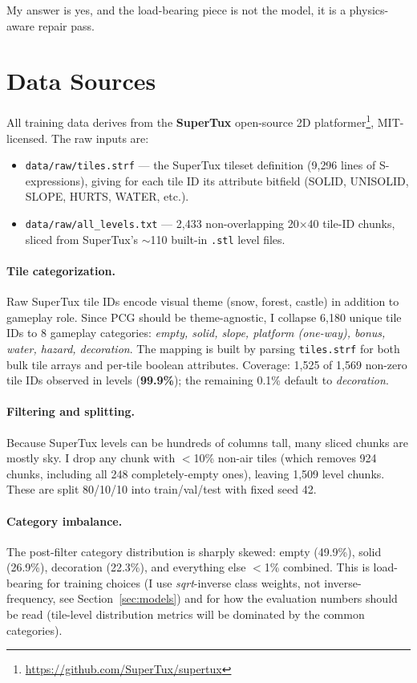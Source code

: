 \documentclass[11pt]{article}
\begin{document}
My answer is yes, and the load-bearing piece is not the model, it
is a physics-aware repair pass.

\section{Data Sources}

All training data derives from the \textbf{SuperTux} open-source 2D
platformer\footnote{\url{https://github.com/SuperTux/supertux}},
MIT-licensed. The raw inputs are:

\begin{itemize}
    \item \texttt{data/raw/tiles.strf} --- the SuperTux tileset
    definition (9{,}296 lines of S-expressions), giving for each tile
    ID its attribute bitfield (SOLID, UNISOLID, SLOPE, HURTS, WATER,
    etc.).
    \item \texttt{data/raw/all\_levels.txt} --- 2{,}433 non-overlapping
    20$\times$40 tile-ID chunks, sliced from SuperTux's $\sim$110
    built-in \texttt{.stl} level files.
\end{itemize}

\paragraph{Tile categorization.}
Raw SuperTux tile IDs encode visual theme (snow, forest, castle) in
addition to gameplay role. Since PCG should be theme-agnostic, I
collapse 6{,}180 unique tile IDs to 8 gameplay categories:
\emph{empty, solid, slope, platform (one-way), bonus, water, hazard,
decoration}. The mapping is built by parsing \texttt{tiles.strf} for
both bulk tile arrays and per-tile boolean attributes. Coverage:
1{,}525 of 1{,}569 non-zero tile IDs observed in levels (\textbf{99.9\%});
the remaining 0.1\% default to \emph{decoration}.

\paragraph{Filtering and splitting.}
Because SuperTux levels can be hundreds of columns tall, many sliced
chunks are mostly sky. I drop any chunk with $<$10\% non-air tiles
(which removes 924 chunks, including all 248 completely-empty ones),
leaving 1{,}509 level chunks. These are split 80/10/10 into
train/val/test with fixed seed 42.

\paragraph{Category imbalance.}
The post-filter category distribution is sharply skewed: empty
(49.9\%), solid (26.9\%), decoration (22.3\%), and everything else
$<$1\% combined. This is load-bearing for training choices (I use
\emph{sqrt}-inverse class weights, not inverse-frequency, see
Section~\ref{sec:models}) and for how the evaluation numbers should
be read (tile-level distribution metrics will be dominated by the
common categories).
\end{document}
